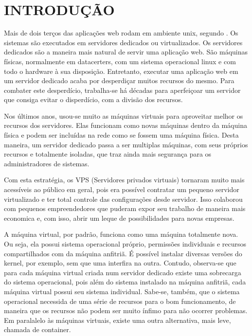 \documentclass[
	12pt,				%
	openright,			%
	oneside,			%
	a4paper,			%
	chapter=TITLE,		%
	section=TITLE,		%
	english,			%
	french,				%
	spanish,			%
	brazil				%
	]{abntex2}
\begin{document}
\tableofcontents*
\clearpage

\textual



\chapter{INTRODUÇÃO}

Mais de dois terços das aplicações web rodam em ambiente unix, segundo . Os sistemas são executados em servidores dedicados ou virtualizados. Os servidores dedicados são a maneira mais natural de servir uma aplicação web. São máquinas físicas, normalmente em datacerters, com um sistema operacional linux e com todo o hardware à sua disposição.
Entretanto, executar uma aplicação web em um servidor dedicado acaba por desperdiçar muitos recursos do mesmo. Para combater este desperdício, trabalha-se há décadas para aperfeiçoar um servidor que consiga evitar o disperdício, com a divisão dos recursos.

Nos últimos anos, usou-se muito as máquinas virtuais para aproveitar melhor os recursos dos servidores. Elas funcionam como novas máquinas dentro da máquina física e podem ser incluídas na rede como se fossem uma máquina física. Desta maneira, um servidor dedicado passa a ser multiplas máquinas, com seus próprios recursos e totalmente isoladas, que traz ainda mais segurança para os administradores de sistemas.

Com esta estratégia, os VPS (Servidores privados virtuais) tornaram muito mais acessíveis ao público em geral, pois era possível contratar um pequeno servidor virtualizado e ter total controle das configurações desde servidor. Isso colaborou com pequenos empreendedores que puderam expor seu trabalho de maneira mais economica e, com isso, abrir um leque de possibilidades para novas empresas.

A máquina virtual, por padrão, funciona como uma máquina totalmente nova. Ou seja, ela possui sistema operacional próprio, permissões individuais e recursos compartilhados com da máquina anfitriã. É possível instalar diversas versões do kernel, por exemplo, sem que uma interfira na outra. Contudo, observa-se que para cada máquina virtual criada num servidor dedicado existe uma sobrecarga do sistema operacional, pois além do sistema instalado na máquina anfitriã, cada máquina virtual possui seu sistema individual. Sabe-se, também, que o sistema operacional necessida de uma série de recursos para o bom funcionamento, de maneira que os recursos não podem ser muito ínfimo para não ocorrer problemas. Em paralalelo às máquinas virtuais, existe uma outra alternativa, mais leve, chamada de container.
\end{document}
